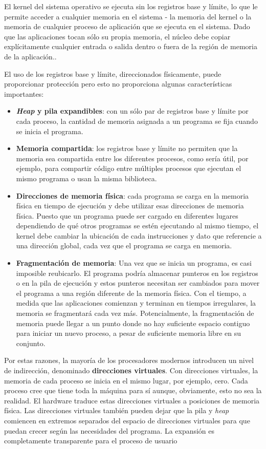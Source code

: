\documentclass[10pt]{book}
\begin{document}
El kernel del sistema operativo se ejecuta sin los registros base y límite, lo que le permite acceder a cualquier memoria en el sistema - la memoria del kernel o la memoria de cualquier proceso de aplicación que se ejecuta en el sistema. Dado que las aplicaciones tocan sólo su propia memoria, el núcleo debe copiar explícitamente cualquier entrada o salida dentro o fuera de la región de memoria de la aplicación..

El uso de los registros base y límite, direccionados físicamente, puede proporcionar protección pero esto no proporciona algunas características importantes:

\begin{itemize}
\item \textbf{\textit{Heap} y pila expandibles}: con un sólo par de registros base y límite por cada proceso, la cantidad de memoria asignada a un programa se fija cuando se inicia el programa.
\item \textbf{Memoria compartida}: los registros base y límite no permiten que la memoria sea compartida entre los diferentes procesos, como sería útil, por ejemplo, para compartir código entre múltiples procesos que ejecutan el mismo programa o usan la misma biblioteca.
\item \textbf{Direcciones de memoria física}: cada programa se carga en la memoria física en tiempo de ejecución y debe utilizar esas direcciones de memoria física. Puesto que un programa puede ser cargado en diferentes lugares dependiendo de qué otros programas se estén ejecutando al mismo tiempo, el kernel debe cambiar la ubicación de cada instrucciones y dato que referencie a una dirección global, cada vez que el programa se carga en memoria.
\item \textbf{Fragmentación de memoria}: Una vez que se inicia un programa, es casi imposible reubicarlo. El programa podría almacenar punteros en los registros o en la pila de ejecución y estos punteros necesitan ser cambiados para mover el programa a una región diferente de la memoria física. Con el tiempo, a medida que las aplicaciones comienzan y terminan en tiempos irregulares, la memoria se fragmentará cada vez más. Potencialmente, la fragmentación de memoria puede llegar a un punto donde no hay suficiente espacio contiguo para iniciar un nuevo proceso, a pesar de suficiente memoria libre en su conjunto.
\end{itemize}

Por estas razones, la mayoría de los procesadores modernos introducen un nivel de indirección, denominado \textbf{direcciones virtuales}. Con direcciones virtuales, la memoria de cada proceso se inicia en el mismo lugar, por ejemplo, cero. Cada proceso cree que tiene toda la máquina para sí aunque, obviamente, esto no sea la realidad. El hardware traduce estas direcciones virtuales a posiciones de memoria física. Las direcciones virtuales también pueden dejar que la pila y \textit{heap} comiencen en extremos separados del espacio de direcciones virtuales para que puedan crecer según las necesidades del programa. La expansión es completamente transparente para el proceso de usuario
 
\end{document}
